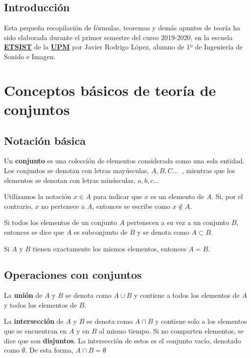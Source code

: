\documentclass[a4paper]{book}
\begin{document}
\newpage
\setlength{\parskip}{0.5em}

\section*{Introducción}
Esta pequeña recopilación de fórmulas, teoremas y demás apuntes de teoría ha sido elaborada durante el primer semestre del curso 2019-2020, en la escuela \href{https://www.etsist.upm.es/}{\textbf{ETSIST}} de la \href{http://www.upm.es/}{\textbf{UPM}} por Javier Rodrigo López, alumno de 1º de Ingeniería de Sonido e Imagen.
\newpage

\setlength{\parskip}{0em}
\tableofcontents
\setlength{\parskip}{0.5em}

\chapter*{Conceptos básicos de teoría de conjuntos}
\section*{Notación básica}
\begin{definicion}
	Un \textbf{conjunto} es una colección de elementos considerada como una sola entidad. Los conjuntos se denotan con letras mayúsculas, $A,B,C \ldots \ $ , mientras que los elementos se denotan con letras minúsculas, $a,b,c \ldots $

	Utilizamos la notación $x\in A$ para indicar que $x$ es un elemento de $A$. Si, por el contrario, $x$ no pertenece a $A$, entonces se escribe como $x\not \in A$.

	Si todos los elementos de un conjunto $A$ pertenecen a su vez a un conjunto $B$, entonces se dice que $A$ es subconjunto de $B$ y se denota como $A\subset B$.

	Si $A$ y $B$ tienen exactamente los mismos elementos, entonces $A=B$.
\end{definicion}

\section*{Operaciones con conjuntos}
\begin{definicion}
	La \textbf{unión} de $A$ y $B$ se denota como $A\cup B$ y contiene a todos los elementos de $A$ y todos los elementos de $B$.
\end{definicion}

\begin{definicion}
	La \textbf{intersección} de $A$ y $B$ se denota como $A\cap B$ y contiene solo a los elementos que se encuentran en $A$ y en $B$ al mismo tiempo. Si no comparten elementos, se dice que son \textbf{disjuntos}. La intersección de estos es el conjunto vacío, denotado como $\emptyset$. De esta forma, $A\cap B = \emptyset$
\end{definicion}
\end{document}
